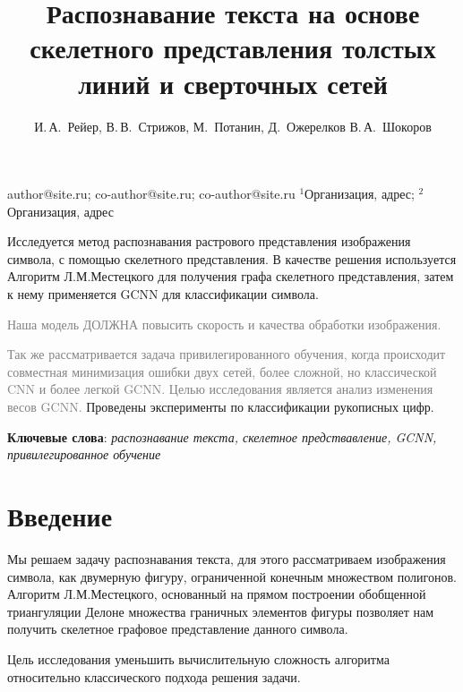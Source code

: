 \documentclass[12pt, twoside]{article}
\begin{document}
\title
    [Шаблон статьи для публикации] %
    {Распознавание текста на основе скелетного представления толстых линий и сверточных сетей}
\author
    { И.\,А.~Рейер, В.\,В.~Стрижов, М.~Потанин, Д.~Ожерелков В.\,А.~Шокоров} %

\email
    {author@site.ru; co-author@site.ru;  co-author@site.ru}
\organization
    {$^1$Организация, адрес; $^2$Организация, адрес}
\abstract
    {
    	Исследуется метод распознавания растрового представления изображения символа, с помощью скелетного представления. В качестве решения используется Алгоритм Л.М.Местецкого для получения графа скелетного представления, затем к нему применяется GCNN для классификации символа. 
    	
    	\textcolor{gray}{Наша модель ДОЛЖНА повысить скорость и качества обработки изображения.}
    
        \textcolor{gray}{Так же рассматривается задача привилегированного обучения, когда происходит совместная минимизация ошибки двух сетей, более сложной, но классической CNN и более легкой GCNN. Целью исследования является анализ изменения весов GCNN.}
        Проведены эксперименты по классификации рукописных цифр.
    	
\bigskip
\noindent
\textbf{Ключевые слова}: \emph {распознавание текста, скелетное предствавление, GCNN, привилегированное обучение}
}



\maketitle


\section{Введение}

Мы решаем задачу распознавания текста, для этого рассматриваем изображения символа, как двумерную фигуру, ограниченной конечным множеством полигонов. Алгоритм Л.М.Местецкого, основанный на прямом построении обобщенной триангуляции Делоне множества граничных элементов фигуры позволяет нам получить скелетное графовое представление данного символа.

Цель исследования уменьшить вычислительную сложность алгоритма относительно классического подхода решения задачи.
\end{document}
